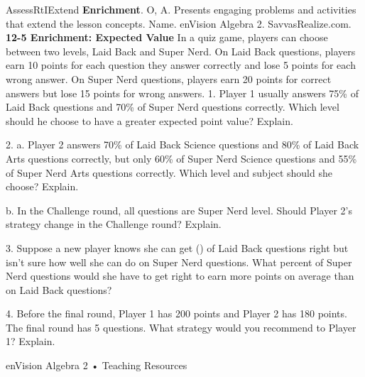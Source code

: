 \documentclass{article}
\newenvironment{te-addendum}[2]{}{}     %
\newcommand{\answer}[1]{}               %
\begin{document}
\begin{te-addendum}{Assess}{RtIExtend}
\textbf{Enrichment}. O, A.
Presents engaging problems and activities that extend the lesson concepts.
Name. enVision Algebra 2. SavvasRealize.com.
\textbf{12-5 Enrichment: Expected Value}
In a quiz game, players can choose between two levels, Laid Back and Super Nerd. On Laid Back questions, players earn 10 points for each question they answer correctly and lose 5 points for each wrong answer. On Super Nerd questions, players earn 20 points for correct answers but lose 15 points for wrong answers.
1. Player 1 usually answers 75\% of Laid Back questions and 70\% of Super Nerd questions correctly. Which level should he choose to have a greater expected point value? Explain.
\answer{Super Nerd; (E(LB)=(0.75)(10)+(0.25)(-5)=6.25) and (E(SN)=(0.7)(20)+(0.3)(-15)=9.5), so (E(SN)>E(LB)).}
2. a. Player 2 answers 70\% of Laid Back Science questions and 80\% of Laid Back Arts questions correctly, but only 60\% of Super Nerd Science questions and 55\% of Super Nerd Arts questions correctly. Which level and subject should she choose? Explain.
\answer{Laid Back Arts; for each level, the subject with the greater probability will earn more points, so compare Laid Back Arts to Super Nerd Science. (E(LBA)=(0.8)(10)+(0.2)(-5)=7) and (E(SNS)=(0.6)(20)+(0.4)(-15)=6), so (E(LBA)>E(SNS)).}
b. In the Challenge round, all questions are Super Nerd level. Should Player 2's strategy change in the Challenge round? Explain.
\answer{Yes; she should switch to Super Nerd Science because (E(SNA)=(0.55)(20)+(0.45)(-15)=4.25), which is less than (E(SNS)=6).}
3. Suppose a new player knows she can get () of Laid Back questions right but isn't sure how well she can do on Super Nerd questions. What percent of Super Nerd questions would she have to get right to earn more points on average than on Laid Back questions?
\answer{about 58\% or more}
4. Before the final round, Player 1 has 200 points and Player 2 has 180 points. The final round has 5 questions. What strategy would you recommend to Player 1? Explain.
\answer{Answers may vary. Sample: Choose only Laid Back questions, because even though your expected gain is less with those questions, you have less chance of losing a lot of points and falling behind Player 2.}
enVision Algebra 2 • Teaching Resources
\end{te-addendum}
\end{document}
